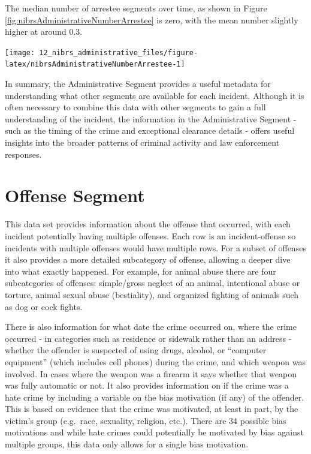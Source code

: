 \documentclass[
]{krantz}
\let\origfigure\figure
\let\endorigfigure\endfigure
\renewenvironment{figure}[1][2] {
    \expandafter\origfigure\expandafter[H]
} {
    \endorigfigure
}
\begin{document}
The median number of arrestee segments over time, as shown
in Figure \ref{fig:nibrsAdministrativeNumberArrestee} is
zero, with the mean number slightly higher at around 0.3.

\begin{figure}

{\centering \texttt{[image: 12\_nibrs\_administrative\_files/figure-latex/nibrsAdministrativeNumberArrestee-1]} 

}

\caption{Annual mean and median number of Arrestee Segments, 1991-2023.}\label{fig:nibrsAdministrativeNumberArrestee}
\end{figure}

In summary, the Administrative Segment provides a useful
metadata for understanding what other segments are available
for each incident. Although it is often necessary to combine
this data with other segments to gain a full understanding
of the incident, the information in the Administrative
Segment - such as the timing of the crime and exceptional
clearance details - offers useful insights into the broader
patterns of criminal activity and law enforcement responses.

\chapter{Offense Segment}\label{offenseSegment}

This data set provides information about the offense that
occurred, with each incident potentially having multiple
offenses. Each row is an incident-offense so incidents with
multiple offenses would have multiple rows. For a subset of
offenses it also provides a more detailed subcategory of
offense, allowing a deeper dive into what exactly happened.
For example, for animal abuse there are four subcategories
of offenses: simple/gross neglect of an animal, intentional
abuse or torture, animal sexual abuse (bestiality), and
organized fighting of animals such as dog or cock fights.

There is also information for what date the crime occurred
on, where the crime occurred - in categories such as
residence or sidewalk rather than an address - whether the
offender is suspected of using drugs, alcohol, or ``computer
equipment'' (which includes cell phones) during the crime,
and which weapon was involved. In cases where the weapon was
a firearm it says whether that weapon was fully automatic or
not. It also provides information on if the crime was a hate
crime by including a variable on the bias motivation (if
any) of the offender. This is based on evidence that the
crime was motivated, at least in part, by the victim's group
(e.g.~race, sexuality, religion, etc.). There are 34
possible bias motivations and while hate crimes could
potentially be motivated by bias against multiple groups,
this data only allows for a single bias motivation.
\end{document}
